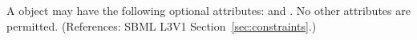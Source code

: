 A \Constraint object may have the following optional attributes:
 and .  No other attributes are permitted.  
(References: SBML L3V1 Section~\ref{sec:constraints}.)
